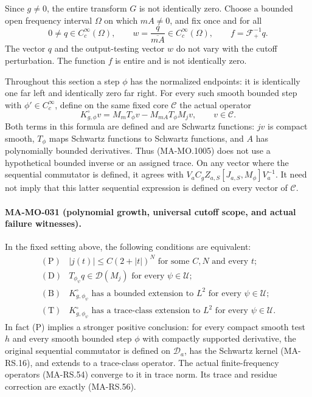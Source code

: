 Since \(g\ne0\), the entire transform \(G\) is not
identically zero.  Choose a bounded open frequency
interval \(\Omega\) on which \(mA\ne0\), and fix once
and for all
\[
 0\ne q\in C_c^\infty(\Omega),\qquad
 w=\frac{q}{\overline{mA}}\in C_c^\infty(\Omega),\qquad
 f=\mathcal F_+^{-1}q .
\tag{MA-MO.1004}
\]
The vector \(q\) and the output-testing vector \(w\)
do not vary with the cutoff perturbation.  The function
\(f\) is entire and is not identically zero.

Throughout this section a step \(\phi\) has the normalized
endpoints: it is identically one far left and identically
zero far right.  For every such smooth bounded step with
\(\phi'\in C_c^\infty\), define on the same fixed core
\(\mathscr C\) the actual operator
\[
 K^\circ_{g,\phi}v
      =M_mT_\phi v-M_{mA}T_\phi M_jv,\qquad v\in\mathscr C .
\tag{MA-MO.1005}
\]
Both terms in this formula are defined and are Schwartz
functions: \(jv\) is compact smooth, \(T_\phi\) maps
Schwartz functions to Schwartz functions, and \(A\)
has polynomially bounded derivatives.  Thus (MA-MO.1005)
does not use a hypothetical bounded inverse or an assigned
trace.  On any vector where the sequential commutator
is defined, it agrees with
\(V_aC_gZ_{a,S}[J_{a,S},M_\phi]V_a^{-1}\).
It need not imply that this latter sequential expression
is defined on every vector of \(\mathscr C\).

\paragraph{MA-MO-031 (polynomial growth, universal cutoff scope, and actual failure witnesses).}
In the fixed setting above, the following conditions
are equivalent:
\[
\begin{array}{ll}
\mathrm{(P)}&
 |j(t)|\le C(2+|t|)^N
          \text{ for some }C,N\text{ and every }t;\\[2pt]
\mathrm{(D)}&
 T_{\phi_\psi}q\in\mathcal D(M_j)
                           \text{ for every }\psi\in\mathscr U;\\[2pt]
\mathrm{(B)}&
 K^\circ_{g,\phi_\psi}\text{ has a bounded extension to }L^2
                           \text{ for every }\psi\in\mathscr U;\\[2pt]
\mathrm{(T)}&
 K^\circ_{g,\phi_\psi}\text{ has a trace-class extension to }L^2
                           \text{ for every }\psi\in\mathscr U .
\end{array}
\tag{MA-MO.1006}
\]
In fact (P) implies a stronger positive conclusion:
for every compact smooth test \(h\) and every smooth
bounded step \(\phi\) with compactly supported derivative,
the original sequential commutator is defined on
\(\mathscr D_a\), has the Schwartz kernel (MA-RS.16),
and extends to a trace-class operator.  The actual
finite-frequency operators (MA-RS.54) converge to it
in trace norm.  Its trace and residue correction are
exactly (MA-RS.56).

